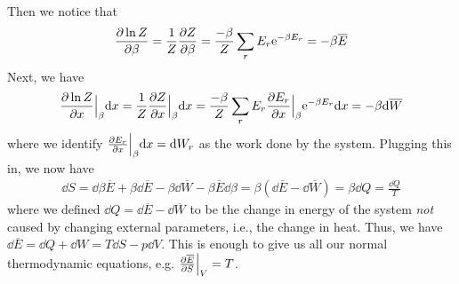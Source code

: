 \documentclass[11pt]{article}
\theoremstyle{remark}
\newcommand{\e}{\mathrm{e}}
\begin{document}
Then we notice that
\begin{align}
\pdv{\ln Z}{\beta} = \frac{1}{Z}\pdv{Z}{\beta} = \frac{-\beta}{Z}\sum_r E_r \e^{-\beta E_r} = -\beta \overline E
\end{align}
Next, we have
\begin{align}
\pdv{\ln Z}{x}\Big|_{\beta}\dd x = \frac{1}{Z}\pdv{Z}{x}\Big|_\beta\dd x = \frac{-\beta}{Z}\sum_r E_r \pdv{E_r}{x}\Big|_\beta\e^{-\beta E_r} \dd x = -\beta \dd \overline W
\end{align}
where we identify $\pdv{E_r}{x}\Big|_{\beta}\dd x = \dd W_r$ as the work done by
the system.
Plugging this in, we now have
\begin{align}
\dd S = \dd \beta \overline E + \beta \dd \overline E - \beta\dd \overline W - \beta \overline E \dd \beta = \beta(\dd \overline E - \dd \overline W) = \beta \dd Q = \frac{\dd Q}{T}
\end{align}
where we defined $\dd Q = \dd \overline E - \dd \overline W$ to be the change in
energy of the system \emph{not} caused by changing external parameters, i.e.,
the change in heat. Thus, we have $\dd \overline E = \dd Q + \dd W = T\dd S - p
\dd V$. This is enough to give us all our normal thermodynamic equations, e.g.
$\pdv{\overline E}{S}\Big|_V = T$.
\end{document}
